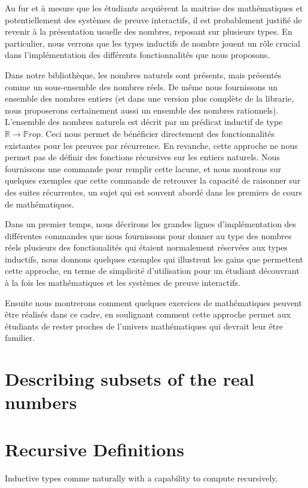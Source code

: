 \documentclass[draft]{jflart}
\begin{document}
Au fur et à mesure que les étudiants acquièrent la maitrise des
mathématiques et potentiellement des systèmes de preuve interactifs,
il est probablement justifié de revenir à la présentation usuelle des
nombres, reposant sur plusieurs types.  En particulier, nous verrons
que les types inductifs de nombre jouent un rôle crucial dans
l'implémentation des différents fonctionnalités que nous proposons.

Dans notre bibliothèque, les nombres naturels sont présents, mais
présentés comme un sous-ensemble des nombres réels.  De même nous
fournissons un ensemble des nombres entiers (et dans une version plus
complète de la librarie, nous proposerons certainement aussi un
ensemble des nombres rationnels).  L'ensemble des nombres naturels est
décrit par un prédicat inductif de type \({\mathbb R} \rightarrow
{\mathbb Prop}\).  Ceci nous permet de bénéficier directement des
fonctionnalités existantes pour les preuves par récurrence.  En
revanche, cette approche ne nous permet pas de définir des fonctions
récursives sur les entiers naturels.  Nous fournissons une commande
pour remplir cette lacune, et nous montrons sur quelques exemples que
cette commande de retrouver la capacité de raisonner sur des suites
récurrentes, un sujet qui est souvent abordé dans les premiers de
cours de mathématiques.

Dans un premier temps, nous décrirons les grandes lignes d'implémentation des
différentes commandes que nous fournissons pour donner au type des
nombres réels plusieurs des fonctionalités qui étaient normalement
réservées aux types inductifs, nous donnons quelques exemples qui
illustrent les gains que permettent cette approche, en terme de
simplicité d'utilisation pour un étudiant découvrant à la fois les
mathématiques et les systèmes de preuve interactifs.

Ensuite nous montrerons comment quelques exercices de mathématiques
peuvent être réalisés dans ce cadre, en soulignant comment cette
approche permet aux étudiants de rester proches de l'univers
mathématiques qui devrait leur être familier.
\section{Describing subsets of the real numbers}
\section{Recursive Definitions}
Inductive types comme naturally with a capability to compute recursively,
\end{document}
